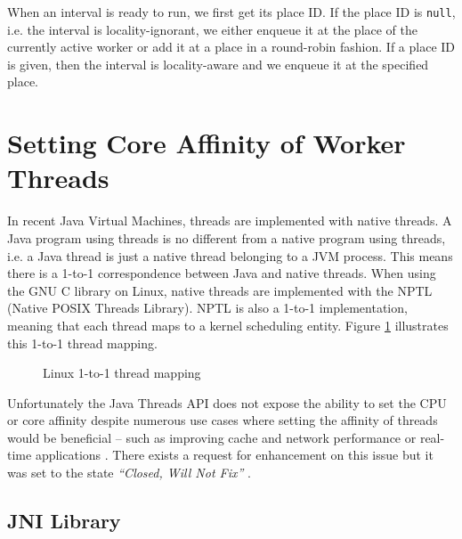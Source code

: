 When an interval is ready to run, we first get its place ID. If the
place ID is \lstinline!null!, i.e. the interval is locality-ignorant,
we either enqueue it at the place of the currently active worker or
add it at a place in a round-robin fashion. If a place ID is given,
then the interval is locality-aware and we enqueue it at the specified
place.


\section{Setting Core Affinity of Worker Threads}
\label{sec:locality-implementation-core-affinity}

In recent Java Virtual Machines, threads are implemented with native
threads. A Java program using threads is no different from a native
program using threads, i.e. a Java thread is just a native thread
belonging to a JVM process. This means there is a 1-to-1
correspondence between Java and native threads. When using the GNU C
library on Linux, native threads are implemented with the NPTL (Native
POSIX Threads Library). NPTL is also a 1-to-1 implementation, meaning
that each thread maps to a kernel scheduling entity. Figure
\ref{fig:locality-implementation-core-affinity-thread-mapping}
illustrates this 1-to-1 thread mapping.

\begin{figure}[htb]
  \centering
  \caption{Linux 1-to-1 thread mapping}
  \label{fig:locality-implementation-core-affinity-thread-mapping}
\end{figure}

Unfortunately the Java Threads API does not expose the ability to set
the CPU or core affinity despite numerous use cases where setting the
affinity of threads would be beneficial -- such as improving cache and
network performance or real-time applications \cite{Love2003, Dow2005,
  Foong2008}. There exists a request for enhancement on this issue but
it was set to the state \emph{``Closed, Will Not Fix''}
\cite{Oracle1999}.

\subsection{JNI Library}
\label{sec:locality-implementation-core-affinity-jni-library}

